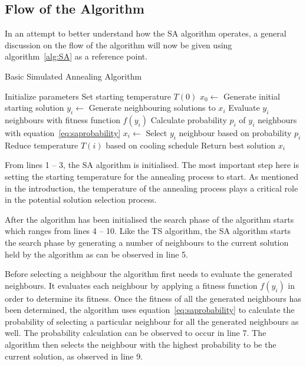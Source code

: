 \subsection{Flow of the Algorithm}
In an attempt to better understand how the \gls{SA} algorithm operates, a general discussion on the flow of the algorithm will now be given using algorithm~\ref{alg:SA} as a reference point.
\begin{algorithm}[H]
\caption{Basic Simulated Annealing Algorithm\cite{VeryFastSAImageEnchancement,ChaosSA}}
\label{alg:SA}
	\begin{algorithmic}[1]
		\State Initialize parameters
		\State Set starting temperature $T(0)$
		\State $x_0 \leftarrow$ Generate initial starting solution
			\State $y_i \leftarrow$ Generate neighbouring solutions to $x_i$
			\State Evaluate $y_i$ neighbours with fitness function $f(y_i)$
			\State Calculate probability $p_i$ of $y_i$ neighbours with equation~\ref{eq:saprobability}
			\State $x_i \leftarrow$ Select $y_i$ neighbour based on probability $p_i$
			\State Reduce temperature $T(i)$ based on cooling schedule
		\EndWhile
		\State Return best solution $x_i$
	\end{algorithmic}
\end{algorithm}

From lines 1 -- 3, the \gls{SA} algorithm is initialised. The most important step here is setting the starting temperature for the annealing process to start. As mentioned in the introduction, the temperature of the annealing process plays a critical role in the potential solution selection process.

After the algorithm has been initialised the search phase of the algorithm starts which ranges from lines 4 -- 10. Like the \gls{TS} algorithm, the \gls{SA} algorithm starts the search phase by generating a number of neighbours to the current solution held by the algorithm as can be observed in line 5.

Before selecting a neighbour the algorithm first needs to evaluate the generated neighbours. It evaluates each neighbour by applying a fitness function $f(y_i)$ in order to determine its fitness.
Once the fitness of all the generated neighbours has been determined, the algorithm uses equation~\ref{eq:saprobability} to calculate the probability of selecting a particular neighbour for all the generated neighbours as well. The probability calculation can be observed to occur in line 7. The algorithm then selects the neighbour with the highest probability to be the current solution, as observed in line 9. 

